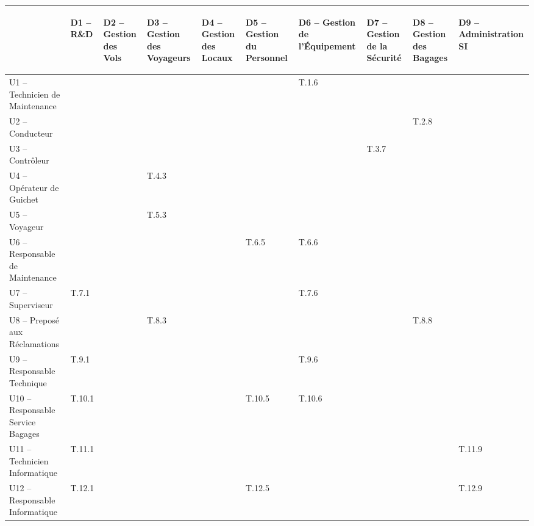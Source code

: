 \providecommand{\DJSPU}[1]{}

\vspace{-2cm}
\begin{turn}{-90}
\begin {tabular} {| l | l | l | l | l | l | l | l | l | l | }
\hline
~
&\begin{sideways}D1 -- R\&D\end{sideways}
&\begin{sideways}D2 -- Gestion des Vols\end{sideways}
&\begin{sideways}D3 -- Gestion des Voyageurs\end{sideways}
&\begin{sideways}D4 -- Gestion des Locaux\end{sideways}
&\begin{sideways}D5 -- Gestion du Personnel\end{sideways}
&\begin{sideways}D6 -- Gestion de l'Équipement\end{sideways}
&\begin{sideways}D7 -- Gestion de la Sécurité\end{sideways}
&\begin{sideways}D8 -- Gestion des Bagages\end{sideways}
&\begin{sideways}D9 -- Administration SI\end{sideways}\\
\hline
U1 --  Technicien de Maintenance  & & & & & &T.1.6 & & &  \\
\hline
U2 --  Conducteur  & & & & & & & &T.2.8 &  \\
\hline
U3 --  Contrôleur  & & & & & & &T.3.7 & &  \\
\hline
U4 --  Opérateur de Guichet  & & &T.4.3 & & & & & &  \\
\hline
U5 --  Voyageur  & & &T.5.3 & & & & & &  \\
\hline
U6 --  Responsable de Maintenance  & & & & &T.6.5 &T.6.6 & &  &\\
\hline
U7 --  Superviseur  &\DJSPU1 T.7.1 & & & & &T.7.6 & & &\\
\hline
U8 --  Preposé aux Réclamations  & & &T.8.3 & & & & &T.8.8 &\\
\hline
U9 --  Responsable Technique  &\DJSPU1 T.9.1 & & & & &T.9.6 & & &\\
\hline
U10 --  Responsable Service Bagages &T.10.1 & & & &T.10.5 &T.10.6 & & &  \\
\hline
U11 --  Technicien Informatique  &T.11.1 & & & & & & & &T.11.9  \\
\hline
U12 --  Responsable Informatique  &T.12.1 & & & &T.12.5 & & & &T.12.9  \\
\hline
\end {tabular}
\end{turn}


